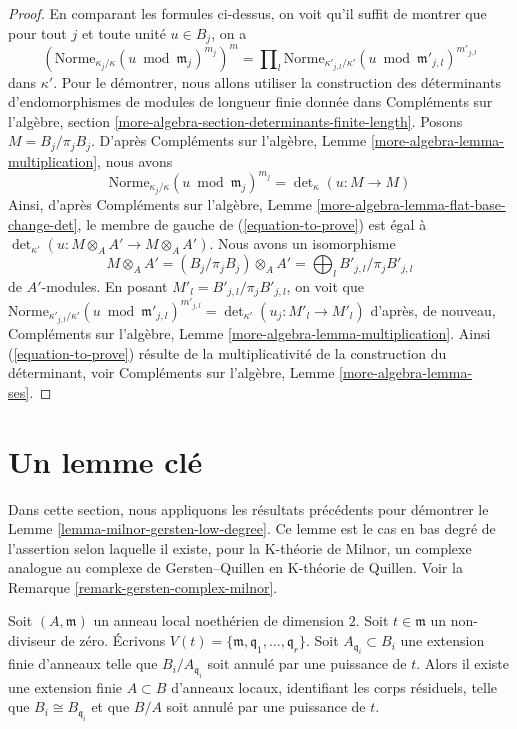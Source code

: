 \begin{proof}
\medskip\noindent
En comparant les formules ci-dessus, on voit qu'il suffit de montrer que
pour tout $j$ et toute unité $u \in B_j$, on a
\begin{equation}
\label{equation-to-prove}
\left(\text{Norme}_{\kappa_j/\kappa}(u \bmod \mathfrak m_j)^{m_j}\right)^m
=
\prod\nolimits_l
\text{Norme}_{\kappa'_{j, l}/\kappa'}(u \bmod \mathfrak m'_{j, l})^{m'_{j, l}}
\end{equation}
dans $\kappa'$. Pour le démontrer, nous allons utiliser la construction des déterminants
d'endomorphismes de modules de longueur finie donnée dans
Compléments sur l'algèbre, section \ref{more-algebra-section-determinants-finite-length}.
Posons $M = B_j/\pi_j B_j$. D'après
Compléments sur l'algèbre, Lemme \ref{more-algebra-lemma-multiplication}, nous avons
$$
\text{Norme}_{\kappa_j/\kappa}(u \bmod \mathfrak m_j)^{m_j} =
\det\nolimits_\kappa(u : M \to M)
$$
Ainsi, d'après
Compléments sur l'algèbre, Lemme \ref{more-algebra-lemma-flat-base-change-det},
le membre de gauche de (\ref{equation-to-prove}) est égal à
$\det_{\kappa'}(u : M \otimes_A A' \to M \otimes_A A')$.
Nous avons un isomorphisme
$$
M \otimes_A A' = (B_j/\pi_j B_j) \otimes_A A' =
\bigoplus\nolimits_l B'_{j, l}/\pi_j B'_{j, l}
$$
de $A'$-modules. En posant $M'_l = B'_{j, l}/\pi_j B'_{j, l}$, on voit que
$\text{Norme}_{\kappa'_{j, l}/\kappa'}(u \bmod \mathfrak m'_{j, l})^{m'_{j, l}}
= \det_{\kappa'}(u_j : M'_l \to M'_l)$ d'après, de nouveau,
Compléments sur l'algèbre, Lemme \ref{more-algebra-lemma-multiplication}.
Ainsi (\ref{equation-to-prove}) résulte de la multiplicativité de la construction
du déterminant, voir Compléments sur l'algèbre, Lemme \ref{more-algebra-lemma-ses}.
\end{proof}






\section{Un lemme clé}
\label{section-key-lemma}

\noindent
Dans cette section, nous appliquons les résultats précédents pour démontrer le
Lemme \ref{lemma-milnor-gersten-low-degree}.
Ce lemme est le cas en bas degré de l'assertion selon laquelle
il existe, pour la K-théorie de Milnor, un complexe analogue
au complexe de Gersten--Quillen en K-théorie de Quillen.
Voir la Remarque \ref{remark-gersten-complex-milnor}.

\begin{lemma}
\label{lemma-perpare-key}
Soit $(A, \mathfrak m)$ un anneau local noethérien de dimension $2$.
Soit $t \in \mathfrak m$ un non-diviseur de zéro. Écrivons
$V(t) = \{\mathfrak m, \mathfrak q_1, \ldots, \mathfrak q_r\}$.
Soit $A_{\mathfrak q_i} \subset B_i$ une extension finie d'anneaux
telle que $B_i/A_{\mathfrak q_i}$ soit annulé par une puissance de
$t$. Alors il existe une extension finie $A \subset B$
d'anneaux locaux, identifiant les corps résiduels,
telle que $B_i \cong B_{\mathfrak q_i}$ et que $B/A$ soit annulé
par une puissance de $t$.
\end{lemma}

